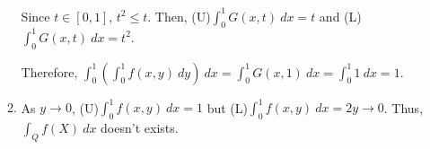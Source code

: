\documentclass[12pt]{article}
\begin{document}
\begin{enumerate}
\begin{enumerate}
        Since $t \in [0, 1]$, $t^2 \leq t$.
        Then, (U)$\displaystyle\int_{0}^{1} G(x, t)\ dx = t$ and (L)$\displaystyle\int_{0}^{1} G(x, t)\ dx = t^2$.

        Therefore, $\displaystyle\int_{0}^{1} (\displaystyle\int_{0}^{1} f(x, y)\ dy)\ dx = \displaystyle\int_{0}^{1} G(x, 1)\ dx = \displaystyle\int_{0}^{1} 1\ dx = 1$.

        \item As $y \to 0$, (U)$\displaystyle\int_{0}^{1} f(x, y)\ dx = 1$ but (L)$\displaystyle\int_{0}^{1} f(x, y)\ dx = 2y \to 0$.
        Thus, $\displaystyle\int_{Q} f(X)\ dx$ doesn't exists.
    \end{enumerate}
\end{enumerate}
\end{document}
